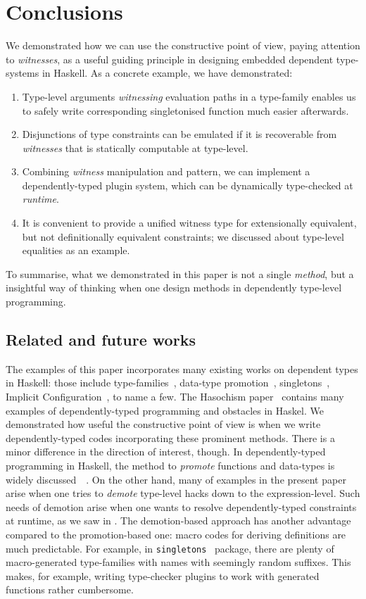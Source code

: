 \documentclass[demotion-paper.tex]{subfiles}
\begin{document}
\section{Conclusions}
\label{sec:concl}
We demonstrated how we can use the constructive point of view, paying attention to \emph{witnesses}, as a useful guiding principle in designing embedded dependent type-systems in Haskell.
As a concrete example, we have demonstrated:
\begin{enumerate}
  \item Type-level arguments \emph{witnessing} evaluation paths in a type-family enables us to safely write corresponding singletonised function much easier afterwards.
  \item Disjunctions of type constraints can be emulated if it is recoverable from \emph{witnesses} that is statically computable at type-level.
  \item Combining \emph{witness} manipulation and  pattern, we can implement a dependently-typed plugin system, which can be dynamically type-checked at \emph{runtime}.
  \item It is convenient to provide a unified witness type for extensionally equivalent, but not definitionally equivalent constraints; we discussed about type-level equalities as an example.
\end{enumerate}
To summarise, what we demonstrated in this paper is not a single \emph{method}, but a insightful way of thinking when one design methods in dependently type-level programming.

\subsection{Related and future works}
The examples of this paper incorporates many existing works on dependent types in Haskell: those include type-families~\cite{Kiselyov:2010aa}, data-type promotion~\cite{Yorgey:2012}, singletons~\cite{Eisenberg:2012}, Implicit Configuration~\cite{Kiselyov:2004aa}, to name a few.
The Hasochism paper~\cite{10.1145/2503778.2503786} contains many examples of dependently-typed programming and obstacles in Haskel.
We demonstrated how useful the constructive point of view is when we write dependently-typed codes incorporating these prominent methods.
There is a minor difference in the direction of interest, though.
In dependently-typed programming in Haskell, the method to \emph{promote} functions and data-types is widely discussed~~\cite{Yorgey:2012,Eisenberg:2012,10.1145/2503778.2503786}.
On the other hand, many of examples in the present paper arise when one tries to \emph{demote} type-level hacks down to the expression-level.
Such needs of demotion arise when one wants to resolve dependently-typed constraints at runtime, as we saw in .
The demotion-based approach has another advantage compared to the promotion-based one: macro codes for deriving definitions are much predictable.
For example, in \texttt{singletons}~\cite{singletons} package, there are plenty of macro-generated type-families with names with seemingly random suffixes.
This makes, for example, writing type-checker plugins to work with generated functions rather cumbersome.
\end{document}
